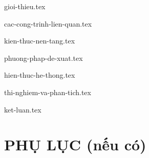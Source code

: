 \documentclass[a4paper, 12pt]{article}
\theoremstyle{definition}
\begin{document}
\pagebreak
\tableofcontents

\thispagestyle{empty}
\pagebreak
\listoffigures
\pagebreak
\listoftables

\pagebreak
{gioi-thieu.tex}
\pagebreak

{cac-cong-trinh-lien-quan.tex}
\pagebreak

{kien-thuc-nen-tang.tex}
\pagebreak

{phuong-phap-de-xuat.tex}
\pagebreak

{hien-thuc-he-thong.tex}
\pagebreak

{thi-nghiem-va-phan-tich.tex}
\pagebreak

{ket-luan.tex}
\pagebreak

\printbibliography[title={Tài liệu tham khảo}]
\pagebreak

\section*{PHỤ LỤC (nếu có)}
\end{document}

